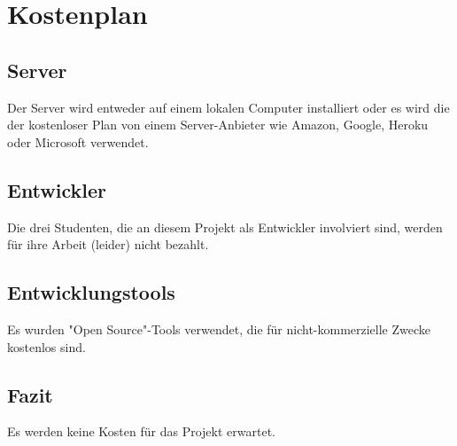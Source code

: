 \section{Kostenplan}
\subsection{Server}
Der Server wird entweder auf einem lokalen Computer installiert oder es wird die der kostenloser Plan von einem Server-Anbieter wie Amazon, Google, Heroku oder Microsoft verwendet.

\subsection{Entwickler}
Die drei Studenten, die an diesem Projekt als Entwickler involviert sind, werden für ihre Arbeit (leider) nicht bezahlt.

\subsection{Entwicklungstools}
Es wurden "Open Source"-Tools verwendet, die für nicht-kommerzielle Zwecke kostenlos sind.

\subsection{Fazit}
Es werden keine Kosten für das Projekt erwartet.